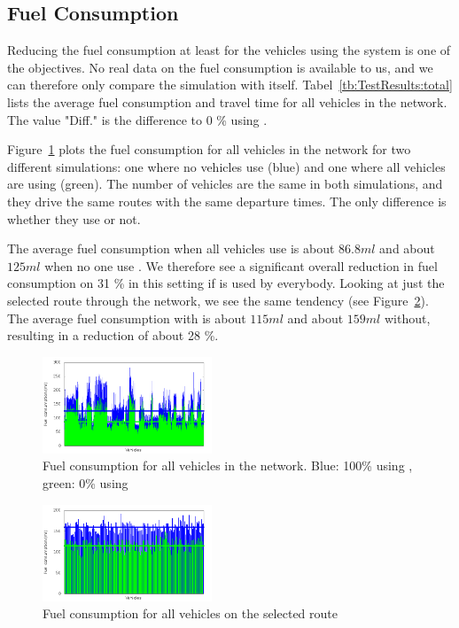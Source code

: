 \subsection{Fuel Consumption}
Reducing the fuel consumption at least for the vehicles using the system is one of the objectives.
No real data on the fuel consumption is available to us, and we can therefore only compare the simulation with itself. 
Tabel~\ref{tb:TestResults:total} lists the average fuel consumption and travel time for all vehicles in the network. 
The value "Diff." is the difference to 0 \% using \tech.

Figure~\ref{fig:TestResults:fuelTotal} plots the fuel consumption for all vehicles in the network for two different simulations: one where no vehicles use \tech (blue) and one where all vehicles are using \tech (green).
The number of vehicles are the same in both simulations, and they drive the same routes with the same departure times. 
The only difference is whether they use \tech or not.

The average fuel consumption when all vehicles use \tech is about $86.8 ml$ and about $125 ml$ when no one use \tech.
We therefore see a significant overall reduction in fuel consumption on 31 \% in this setting if \tech is used by everybody.
Looking at just the selected route through the network, we see the same tendency (see Figure~\ref{fig:TestResults:fuelRoute}). 
The average fuel consumption with \tech is about $115 ml$ and about $159 ml$ without, resulting in a reduction of about 28 \%.
\begin{figure}[htb]
\includegraphics[width=0.45\textwidth]{../images/tp0c0_8/fuelTotal.png}
\caption{Fuel consumption for all vehicles in the network. Blue: 100\% using \tech, green: 0\% using \tech}
\label{fig:TestResults:fuelTotal}
\end{figure}

\begin{figure}[htb]
\includegraphics[width=0.45\textwidth]{../images/tp0c0_8/fuelRoute.png}
\caption{Fuel consumption for all vehicles on the selected route}
\label{fig:TestResults:fuelRoute}
\end{figure}

